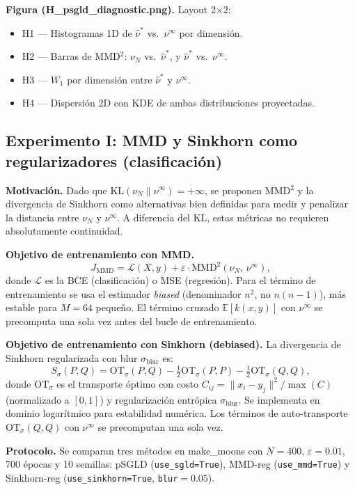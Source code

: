 \documentclass[11pt, a4paper]{article}
\theoremstyle{definition}
\newcommand{\E}{\mathbb{E}}
\begin{document}
\textbf{Figura (H\_psgld\_diagnostic.png).} Layout 2×2:
\begin{itemize}
  \item H1 — Histogramas 1D de $\hat{\nu}^*$ vs.\ $\nu^\infty$ por dimensión.
  \item H2 — Barras de MMD$^2$: $\nu_N$ vs.\ $\hat{\nu}^*$, y $\hat{\nu}^*$ vs.\ $\nu^\infty$.
  \item H3 — $W_1$ por dimensión entre $\hat{\nu}^*$ y $\nu^\infty$.
  \item H4 — Dispersión 2D con KDE de ambas distribuciones proyectadas.
\end{itemize}

\subsection{Experimento I: MMD y Sinkhorn como regularizadores (clasificación)}
\label{sec:exp_i}

\textbf{Motivación.} Dado que $\mathrm{KL}(\nu_N\|\nu^\infty)=+\infty$,
se proponen MMD$^2$ y la divergencia de Sinkhorn como alternativas bien definidas
para medir y penalizar la distancia entre $\nu_N$ y $\nu^\infty$.
A diferencia del KL, estas métricas no requieren absolutamente continuidad.

\textbf{Objetivo de entrenamiento con MMD.}
\[
  J_\text{MMD} = \mathcal{L}(X, y) + \varepsilon\cdot\mathrm{MMD}^2(\nu_N,\,\nu^\infty),
\]
donde $\mathcal{L}$ es la BCE (clasificación) o MSE (regresión).
Para el término de entrenamiento se usa el estimador \emph{biased}
(denominador $n^2$, no $n(n-1)$), más estable para $M=64$ pequeño.
El término cruzado $\E[k(x,y)]$ con $\nu^\infty$ se precomputa una sola
vez antes del bucle de entrenamiento.

\textbf{Objetivo de entrenamiento con Sinkhorn (debiased).}
La divergencia de Sinkhorn regularizada con blur $\sigma_\text{blur}$ es:
\[
  S_\sigma(P, Q) = \mathrm{OT}_\sigma(P,Q)
  - \tfrac{1}{2}\mathrm{OT}_\sigma(P,P)
  - \tfrac{1}{2}\mathrm{OT}_\sigma(Q,Q),
\]
donde $\mathrm{OT}_\sigma$ es el transporte óptimo con costo
$C_{ij} = \|x_i - y_j\|^2 / \max(C)$ (normalizado a $[0,1]$)
y regularización entrópica $\sigma_\text{blur}$.
Se implementa en dominio logarítmico para estabilidad numérica.
Los términos de auto-transporte $\mathrm{OT}_\sigma(Q,Q)$ con $\nu^\infty$
se precomputan una sola vez.

\textbf{Protocolo.} Se comparan tres métodos en make\_moons con $N=400$,
$\varepsilon=0.01$, 700 épocas y 10 semillas:
pSGLD (\texttt{use\_sgld=True}), MMD-reg (\texttt{use\_mmd=True})
y Sinkhorn-reg (\texttt{use\_sinkhorn=True}, \texttt{blur}$=0.05$).
\end{document}

